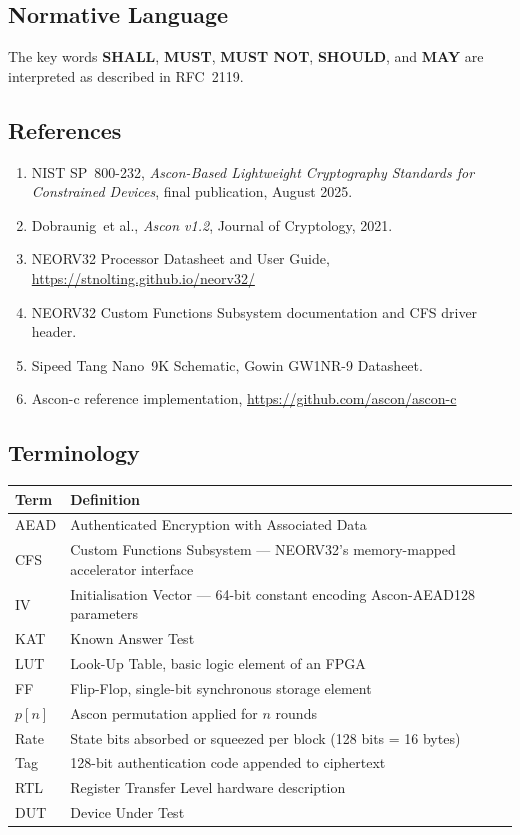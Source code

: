 \documentclass[11pt,a4paper]{article}
\begin{document}
\subsection{Normative Language}

The key words \textbf{SHALL}, \textbf{MUST}, \textbf{MUST NOT},
\textbf{SHOULD}, and \textbf{MAY} are interpreted as described in RFC~2119.

\subsection{References}

\begin{enumerate}
  \item NIST SP~800-232, \textit{Ascon-Based Lightweight Cryptography Standards for Constrained Devices}, final publication, August 2025.
  \item Dobraunig~et al., \textit{Ascon v1.2}, Journal of Cryptology, 2021.
  \item NEORV32 Processor Datasheet and User Guide, \url{https://stnolting.github.io/neorv32/}
  \item NEORV32 Custom Functions Subsystem documentation and CFS driver header.
  \item Sipeed Tang Nano~9K Schematic, Gowin GW1NR-9 Datasheet.
  \item Ascon-c reference implementation, \url{https://github.com/ascon/ascon-c}
\end{enumerate}


\subsection{Terminology}

\begin{tabular}{@{}lL{10cm}@{}}
  \toprule
  \textbf{Term} & \textbf{Definition} \\
  \midrule
  AEAD    & Authenticated Encryption with Associated Data \\
  CFS     & Custom Functions Subsystem --- NEORV32's memory-mapped accelerator interface \\
  IV      & Initialisation Vector --- 64-bit constant encoding Ascon-AEAD128 parameters \\
  KAT     & Known Answer Test \\
  LUT     & Look-Up Table, basic logic element of an FPGA \\
  FF      & Flip-Flop, single-bit synchronous storage element \\
  $p[n]$  & Ascon permutation applied for $n$ rounds \\
  Rate    & State bits absorbed or squeezed per block (128 bits = 16 bytes) \\
  Tag     & 128-bit authentication code appended to ciphertext \\
  RTL     & Register Transfer Level hardware description \\
  DUT     & Device Under Test \\
  \bottomrule
\end{tabular}
\end{document}
